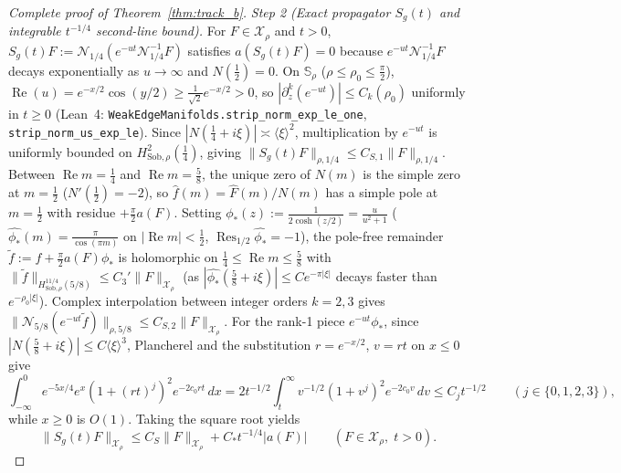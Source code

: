 \documentclass[11pt,a4paper]{article}
\begin{document}
\begin{proof}[Complete proof of Theorem~\ref{thm:track_b}]
\emph{Step 2 (Exact propagator $S_g(t)$ and integrable $t^{-1/4}$ second-line bound).}
For $F\in\mathcal{X}_\rho$ and $t>0$, $S_g(t)F:=\mathcal{N}_{1/4}(e^{-ut}\mathcal{N}_{1/4}^{-1}F)$ satisfies $a(S_g(t)F)=0$ because $e^{-ut}\mathcal{N}_{1/4}^{-1}F$ decays exponentially as $u\to\infty$ and $N(\tfrac12)=0$.  On $\mathbb{S}_\rho$ ($\rho\le\rho_0\le\tfrac{\pi}{2}$), $\operatorname{Re}(u)=e^{-x/2}\cos(y/2)\ge\frac{1}{\sqrt{2}}e^{-x/2}>0$, so $|\partial_z^k(e^{-ut})|\le C_k(\rho_0)$ uniformly in $t\ge 0$ (Lean~4: \texttt{WeakEdgeManifolds.strip\_norm\_exp\_le\_one}, \texttt{strip\_norm\_us\_exp\_le}).  Since $|N(\tfrac14+i\xi)|\asymp\langle\xi\rangle^2$, multiplication by $e^{-ut}$ is uniformly bounded on $H^2_{\mathrm{Sob},\rho}(\tfrac14)$, giving $\|S_g(t)F\|_{\rho,1/4}\le C_{S,1}\|F\|_{\rho,1/4}$.
Between $\operatorname{Re}m=\tfrac14$ and $\operatorname{Re}m=\tfrac58$, the unique zero of $N(m)$ is the simple zero at $m=\tfrac12$ ($N'(\tfrac12)=-2$), so $\widehat f(m)=\widehat F(m)/N(m)$ has a simple pole at $m=\tfrac12$ with residue $+\tfrac{\pi}{2}a(F)$.  Setting $\phi_*(z):=\frac{1}{2\cosh(z/2)}=\frac{u}{u^2+1}$ ($\widehat{\phi_*}(m)=\frac{\pi}{\cos(\pi m)}$ on $|\operatorname{Re}m|<\tfrac12$, $\operatorname{Res}_{1/2}\widehat{\phi_*}=-1$), the pole-free remainder $\tilde f:=f+\tfrac{\pi}{2}a(F)\phi_*$ is holomorphic on $\tfrac14\le\operatorname{Re}m\le\tfrac58$ with $\|\tilde f\|_{H^{11/4}_{\mathrm{Sob},\rho}(5/8)}\le C_3'\|F\|_{\mathcal{X}_\rho}$ (as $|\widehat{\phi_*}(\tfrac58+i\xi)|\le C e^{-\pi|\xi|}$ decays faster than $e^{-\rho_0|\xi|}$).  Complex interpolation between integer orders $k=2,3$ gives $\|\mathcal{N}_{5/8}(e^{-ut}\tilde f)\|_{\rho,5/8}\le C_{S,2}\|F\|_{\mathcal{X}_\rho}$.  For the rank-1 piece $e^{-ut}\phi_*$, since $|N(\tfrac58+i\xi)|\le C\langle\xi\rangle^3$, Plancherel and the substitution $r=e^{-x/2}$, $v=rt$ on $x\le 0$ give
\[
\int_{-\infty}^0 e^{-5x/4}e^x(1+(rt)^j)^2 e^{-2c_0 r t}\,dx
=2t^{-1/2}\int_t^\infty v^{-1/2}(1+v^j)^2 e^{-2c_0 v}\,dv\le C_j t^{-1/2}
\qquad(j\in\{0,1,2,3\}),
\]
while $x\ge 0$ is $O(1)$.  Taking the square root yields
\begin{equation}\label{eq:tb_Sg}
\|S_g(t)F\|_{\mathcal{X}_\rho}\le C_S\|F\|_{\mathcal{X}_\rho}+C_* t^{-1/4}|a(F)|
\qquad(F\in\mathcal{X}_\rho,\;t>0).
\end{equation}


\end{proof}
\end{document}
